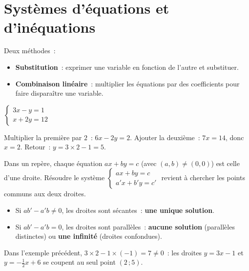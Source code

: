 \section{Syst\`emes d'\'equations et d'in\'equations}

\begin{methode}
Deux m\'ethodes~:
\begin{itemize}
  \item \textbf{Substitution}~: exprimer une variable en fonction de l'autre
        et substituer.
  \item \textbf{Combinaison lin\'eaire}~: multiplier les \'equations par des
        coefficients pour faire dispara\^itre une variable.
\end{itemize}
\end{methode}

\begin{ex}
$\begin{cases}3x - y = 1 \\ x + 2y = 12\end{cases}$

Multiplier la premi\`ere par $2$~: $6x - 2y = 2$.
Ajouter la deuxi\`eme~: $7x = 14$, donc $x=2$.
Retour~: $y = 3\times2-1 = 5$.
\end{ex}

\begin{prop}
Dans un rep\`ere, chaque \'equation $ax+by=c$ (avec $(a,b)\ne(0,0)$) est celle
d'une droite. R\'esoudre le syst\`eme
$\begin{cases}ax+by=c\\a'x+b'y=c'\end{cases}$
revient \`a chercher les points communs aux deux droites.
\begin{itemize}
  \item Si $ab'-a'b\ne0$, les droites sont s\'ecantes~: \textbf{une unique solution}.
  \item Si $ab'-a'b=0$, les droites sont parall\`eles~: \textbf{aucune solution}
        (parall\`eles distinctes) ou \textbf{une infinit\'e} (droites confondues).
\end{itemize}
Dans l'exemple pr\'ec\'edent, $3\times2-1\times(-1)=7\ne0$~: les droites
$y=3x-1$ et $y=-\frac12x+6$ se coupent au seul point $(2\,;5)$.
\end{prop}

